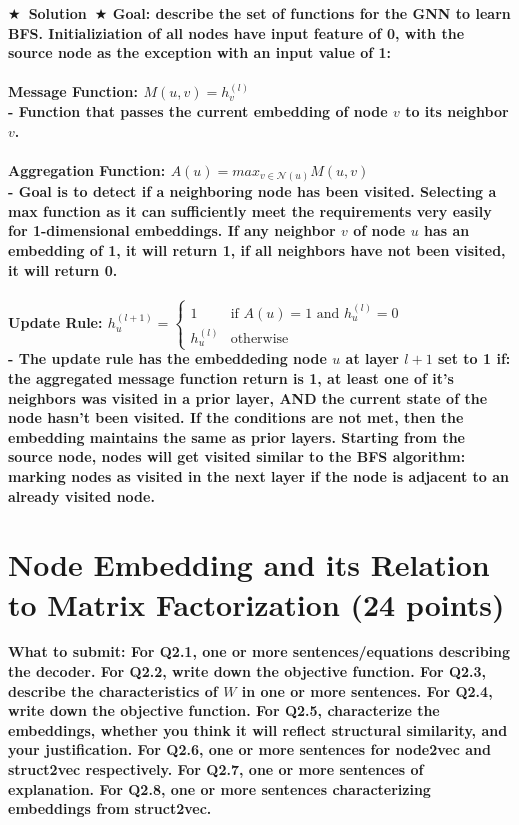 \documentclass{article}
\numberwithin{figure}{section}
\newcommand{\Solution}[1]{{\medskip \color{red} \bf $\bigstar$~\sf \textbf{Solution}~$\bigstar$ \sf #1 } \bigskip}
\begin{document}
\Solution{ Goal: describe the set of functions for the GNN to learn BFS. Initializiation of all nodes have input feature of 0, with the source node as the exception with an input value of 1:\\
\\
Message Function: $M(u,v) = h_v^{(l)}$
\\
- Function that passes the current embedding of node $v$ to its neighbor $v$. \\\\
Aggregation Function: $A(u) = max_{v \in \mathcal{N}(u)}M(u,v)$\\
- Goal is to detect if a neighboring node has been visited. Selecting a max function as it can sufficiently meet the requirements very easily for 1-dimensional embeddings. If any neighbor $v$ of node $u$ has an embedding of 1, it will return 1, if all neighbors have not been visited, it will return 0.\\\\
Update Rule:
$h^{(l+1)}_u = 
\begin{cases} 
1 & \text{if } A(u) = 1 \text{ and } h^{(l)}_u = 0 \\
h^{(l)}_u & \text{otherwise}
\end{cases}$ \\
- The update rule has the embeddeding node $u$ at layer $l+1$ set to 1 if: the aggregated message function return is 1, at least one of it's neighbors was visited in a prior layer, AND the current state of the node hasn't been visited. If the conditions are not met, then the embedding maintains the same as prior layers. Starting from the source node, nodes will get visited similar to the BFS algorithm: marking nodes as visited in the next layer if the node is adjacent to an already visited node.

}



\section{Node Embedding and its Relation to Matrix Factorization (24 points)}

\textbf{ What to submit: For Q2.1, one or more sentences/equations describing the decoder. For Q2.2, write down the objective function. For Q2.3, describe the characteristics of $W$ in one or more sentences. For Q2.4, write down the objective function. For Q2.5, characterize the embeddings, whether you think it will reflect structural similarity, and your justification. For Q2.6, one or more sentences for node2vec and struct2vec respectively. For Q2.7, one or more sentences of explanation. For Q2.8, one or more sentences characterizing embeddings from struct2vec.}
\end{document}
